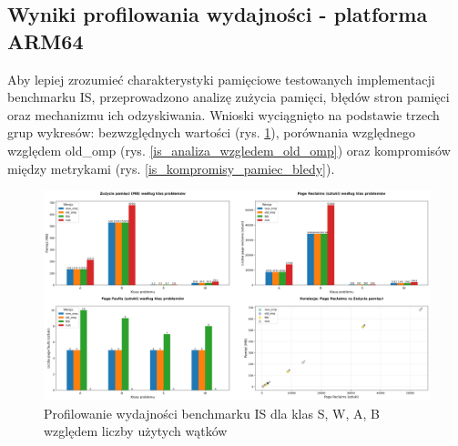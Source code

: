 \subsection{Wyniki profilowania wydajności - platforma ARM64}
Aby lepiej zrozumieć charakterystyki pamięciowe testowanych implementacji benchmarku IS, przeprowadzono analizę zużycia pamięci, błędów stron pamięci oraz mechanizmu ich odzyskiwania. Wnioski wyciągnięto na podstawie trzech grup wykresów: bezwzględnych wartości (rys. \ref{is_porownanie_zuzycia_pamieci}), porównania względnego względem old\_omp (rys. \ref{is_analiza_wzgledem_old_omp}) oraz kompromisów między metrykami (rys. \ref{is_kompromisy_pamiec_bledy}).
\begin{figure}[H]
    \centering
    \includegraphics[width=\textwidth]{analiza/images/parallel/is/arm/chart_01_memory_comparison.png}
    \caption{Profilowanie wydajności benchmarku IS dla klas S, W, A, B względem liczby użytych wątków}
    \label{is_porownanie_zuzycia_pamieci}
\end{figure}

